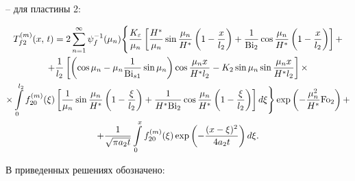 -- для пластины 2:



\begin{multline}

T_{f2}^{(m)} (x,\,t) = 

2\sum\limits_{n = 1}^\infty \psi _f^{ - 1} (\mu _n )

\Bigg\{ \frac{K_\varepsilon }{\mu _n }\left[ {\frac{H^\ast }{\mu _n }\sin 

\frac{\mu _n }{H^\ast }\left( 1 - \frac{x}{l_2 } \right) + \frac{1}{{\rm Bi}_2 

}\cos \frac{\mu _n }{H^\ast }\left( 1 - \frac{x}{l_2 } \right)} \right] +  

\\

+ \frac{1}{l_2 }

\left[ \left( \cos \mu _n - \mu _n \frac{1}{{\rm Bi}_{s1}}\sin \mu _n  \right)

\cos  \frac{\mu _n x}{H^\ast l_2 } - K_2 \sin \mu _n \sin \frac{\mu _n x}{H^\ast l_2 }

\right]\times 

\\

\times \int\limits_0^{l_2 } {f_{20}^{(m)} (\xi )\left[ {\frac{1}{\mu 

_n }\sin \frac{\mu _n }{H^\ast }\left( {1 - \frac{\xi }{l_2 }} \right) + 

\frac{1}{H^\ast {\rm Bi}_2 }\cos \frac{\mu _n }{H^\ast }\left( {1 - \frac{\xi 

}{l_2 }} \right)} \right]d\xi }  \Bigg\} \exp \left( { - \frac{\mu _n^2 

}{H^\ast }{\rm Fo}_2 } \right) + \\

 + \frac{1}{\sqrt {\pi a_2 t} }\int\limits_0^x {f_{20}^{(m)} (\xi )} \exp 

\left(  - \frac{(x - \xi )^2}{4a_2 t} \right)d\xi .

\label{evdok:eq11}

\end{multline}

В приведенных решениях обозначено:


